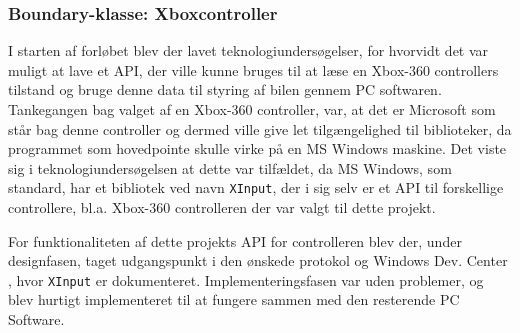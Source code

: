 \subsubsection{Boundary-klasse: Xboxcontroller} \label{sec:controller}
I starten af forløbet blev der lavet teknologiundersøgelser, for hvorvidt det var muligt at lave et API, der ville kunne bruges til at læse en Xbox-360 controllers tilstand og bruge denne data til styring af bilen gennem PC softwaren. 
Tankegangen bag valget af en Xbox-360 controller, var, at det er Microsoft som står bag denne controller og dermed ville give let tilgængelighed til biblioteker, da programmet som hovedpointe skulle virke på en MS Windows maskine. 
Det viste sig i teknologiundersøgelsen at dette var tilfældet, da MS Windows, som standard, har et bibliotek ved navn \texttt{XInput}, der i sig selv er et API til forskellige controllere, bl.a. Xbox-360 controlleren der var valgt til dette projekt.

For funktionaliteten af dette projekts API for controlleren blev der, under designfasen, taget udgangspunkt i den ønskede protokol og Windows Dev. Center \cite{lib:windows_xinput}, hvor \texttt{XInput} er dokumenteret. 
Implementeringsfasen var uden problemer, og blev hurtigt implementeret til at fungere sammen med den resterende PC Software.